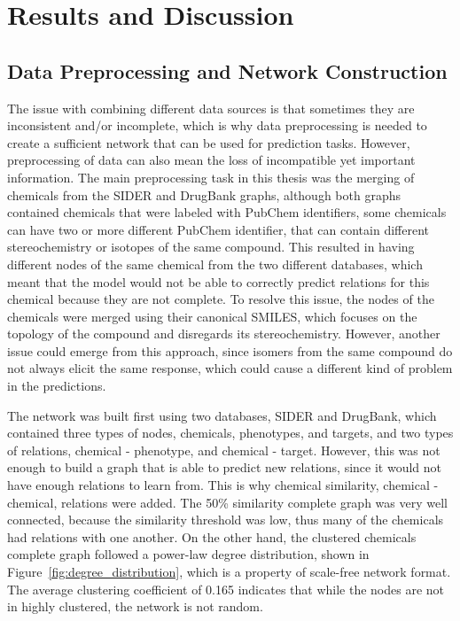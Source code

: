 \chapter{Results and Discussion}
\label{results}

\section{Data Preprocessing and Network Construction}

The issue with combining different data sources is that sometimes they are inconsistent and/or incomplete, which is why data preprocessing is needed to create a sufficient network that can be used for prediction tasks.
However, preprocessing of data can also mean the loss of incompatible yet important information.
The main preprocessing task in this thesis was the merging of chemicals from the \ac{SIDER} and DrugBank graphs, although both graphs contained chemicals that were labeled with PubChem identifiers, some chemicals can have two or more different PubChem identifier, that can contain different stereochemistry or isotopes of the same compound.
This resulted in having different nodes of the same chemical from the two different databases, which meant that the model would not be able to correctly predict relations for this chemical because they are not complete.
To resolve this issue, the nodes of the chemicals were merged using their canonical \ac{SMILES}, which focuses on the topology of the compound and disregards its stereochemistry.
However, another issue could emerge from this approach, since isomers from the same compound do not always elicit the same response, which could cause a different kind of problem in the predictions.

The network was built first using two databases, \ac{SIDER} and DrugBank, which contained three types of nodes, chemicals, phenotypes, and targets, and two types of relations, chemical - phenotype, and chemical - target.
However, this was not enough to build a graph that is able to predict new relations, since it would not have enough relations to learn from.
This is why chemical similarity, chemical - chemical, relations were added.
The 50\% similarity complete graph was very well connected, because the similarity threshold was low, thus many of the chemicals had relations with one another.
On the other hand, the clustered chemicals complete graph followed a power-law degree distribution, shown in Figure~\ref{fig:degree_distribution}, which is a property of scale-free network format.
The average clustering coefficient of 0.165 indicates that while the nodes are not in highly clustered, the network is not random.

